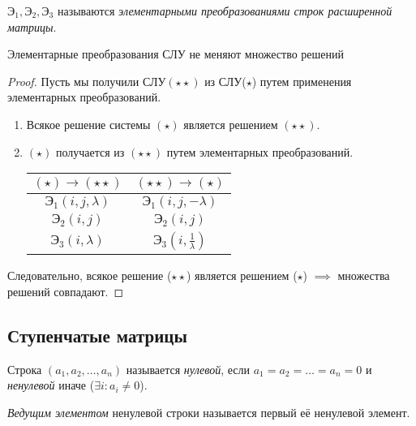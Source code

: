 $\text{Э}_1, \text{Э}_2, \text{Э}_3$ называются \textit{элементарными преобразованиями строк расширенной матрицы}.

\begin{lemma}
    Элементарные преобразования СЛУ не меняют множество решений
\end{lemma}

\begin{proof}
    Пусть мы получили СЛУ$(\star\star)$ из СЛУ($\star$) путем применения элементарных преобразований.

    \begin{enumerate}[nosep]
    \item
        Всякое решение системы $(\star)$ является решением $(\star\star)$.
    \item
        $(\star)$ получается из $(\star\star)$ путем элементарных преобразований.

        \begin{tabular}{c|c|}
            $(\star) \to (\star\star)$ & $(\star\star) \to (\star)$ \\
            \hline
            $\text{Э}_1(i, j, \lambda)$ & $\text{Э}_1(i, j, -\lambda)$ \\
            $\text{Э}_2(i, j)$ & $\text{Э}_2(i, j)$ \\
            $\text{Э}_3(i, \lambda)$ & $\text{Э}_3(i, \frac{1}{\lambda})$
        \end{tabular}
    \end{enumerate} 

    Следовательно, всякое решение ($\star\star$) является решением ($\star$) $\implies$ множества решений совпадают.
\end{proof}


\subsection{Ступенчатые матрицы}

\begin{definition}
    Строка $(a_1, a_2, \dots, a_n)$ называется \textit{нулевой}, если $a_1 = a_2 = \dots = a_n = 0$ и \textit{ненулевой} иначе ($\exists i : a_i \neq 0$).
\end{definition}

\begin{definition}
    \textit{Ведущим элементом} ненулевой строки называется первый её ненулевой элемент.
\end{definition}

